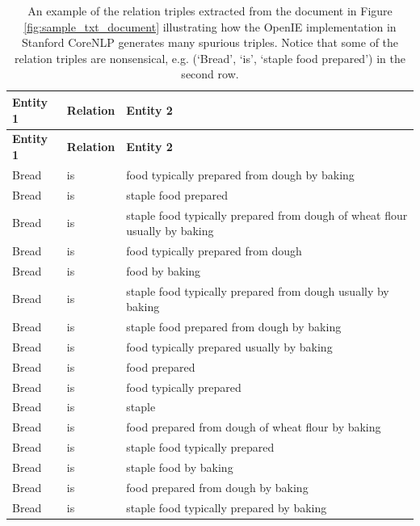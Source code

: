 \documentclass[12pt]{article}
\theoremstyle{grammarstyle}
\begin{document}
\begin{longtable}{|l|l|p{8cm}|} 
    \caption{An example of the relation triples extracted from the document in Figure \ref{fig:sample_txt_document} illustrating how the OpenIE implementation in Stanford CoreNLP generates many spurious triples. Notice that some of the relation triples are nonsensical, e.g. (`Bread', `is', `staple food prepared') in the second row.} 
    \label{tab:openie_example} \\
    \hline
    \textbf{Entity 1} & \textbf{Relation} & \textbf{Entity 2} \\
    \hline
    \endfirsthead
    
    \hline
    \textbf{Entity 1} & \textbf{Relation} & \textbf{Entity 2} \\
    \hline
    \endhead
    Bread    &	is	&    food typically prepared from dough by baking \\
    \hline
    Bread    &	is	&    staple food prepared \\
    \hline
    Bread    &	is	&    staple food typically prepared from dough of wheat flour usually by baking \\
    \hline
    Bread    &	is	&    food typically prepared from dough \\
    \hline
    Bread    &	is &    food by	baking \\
    \hline
    Bread    &	is	&    staple food typically prepared from dough usually by baking \\
    \hline
    Bread    &	is	&    staple food prepared from dough by baking \\
    \hline
    Bread    &	is	&    food typically prepared usually by baking \\
    \hline
    Bread    &	is	&    food prepared \\
    \hline
    Bread    &	is	&    food typically prepared \\
    \hline
    Bread    &	is	&    staple \\
    \hline
    Bread    &	is	&    food prepared from dough of wheat flour by baking \\
    \hline
    Bread    &	is	&    staple food typically prepared \\
    \hline
    Bread    &	is &    staple food by	baking \\
    \hline
    Bread    &	is	&    food prepared from dough by baking \\
    \hline
    Bread    &	is	&    staple food typically prepared by baking \\
    \hline

\end{longtable}
\end{document}
